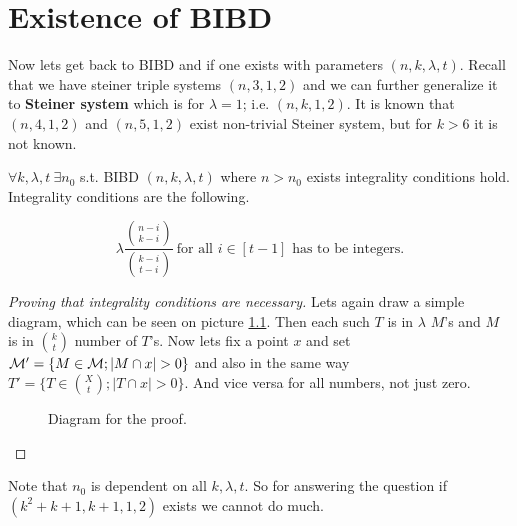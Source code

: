 \chapter{Existence of BIBD}

Now lets get back to BIBD and if one exists with parameters $(n,k,\lambda,t)$. Recall that we have steiner triple systems $(n,3,1,2)$ and we can further generalize it to \textbf{Steiner system} which is for $\lambda = 1$; i.e. $(n,k,1,2)$. It is known that $(n,4,1,2)$ and $(n,5,1,2)$ exist non-trivial Steiner system, but for $k > 6$ it is not known.

\begin{thm}[P. Keevash]
	$\forall k, \lambda, t \ \exists n_0$ s.t. BIBD $(n,k,\lambda, t)$ where $n > n_0$ exists \ifft integrality conditions hold. Integrality conditions are the following.
	
	$$
	\lambda \frac{\binom{n - i}{k-i}}{\binom{k-i}{t-i}} \ \text{for all } i \in [t-1] \text{ has to be integers.}
	$$
\end{thm}

\begin{proof}[Proving that integrality conditions are necessary]
	Lets again draw a simple diagram, which can be seen on picture \ref{nec-integr-cond}. Then each such $T$ is in $\lambda$ $M$'s and $M$ is in $\binom{k}{t}$ number of $T$'s. Now lets fix a point $x$ and set $\mathcal{M}' = \{M \in \mathcal{M}; |M \cap x| > 0\}$ and also in the same way $T' = \{T \in \binom{X}{t}; |T \cap x| > 0\}$. And vice versa for all numbers, not just zero.
	
	\begin{figure}[!ht]\centering
		\caption{Diagram for the proof.}
		\label{nec-integr-cond}
	\end{figure}
\end{proof}

Note that $n_0$ is dependent on all $k,\lambda,t$. So for answering the question if $(k^2 + k +1, k+1, 1, 2)$ exists we cannot do much.

